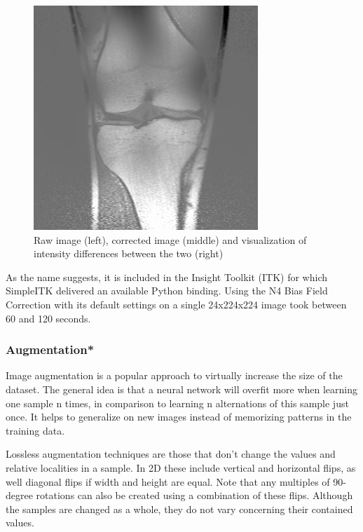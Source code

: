 \begin{figure}[H]
\endminipage\hfill
{}%
  \includegraphics[width=\linewidth]{imgs/diff2.jpg}
\endminipage
\caption{Raw image (left), corrected image (middle) and visualization of intensity differences between the two (right)}
\end{figure}

As the name suggests, it is included in the Insight Toolkit (ITK) for which SimpleITK delivered an available Python binding. Using the N4 Bias Field Correction with its default settings on a single 24x224x224 image took between 60 and 120 seconds.

\subsubsection{Augmentation*}

Image augmentation is a popular approach to virtually increase the size of the dataset. The general idea is that a neural network will overfit more when learning one sample n times, in comparison to learning n alternations of this sample just once. It helps to generalize on new images instead of memorizing patterns in the training data.

Lossless augmentation techniques are those that don't change the values and relative localities in a sample. In 2D these include vertical and horizontal flips, as well diagonal flips if width and height are equal. Note that any multiples of 90-degree rotations can also be created using a combination of these flips. Although the samples are changed as a whole, they do not vary concerning their contained values. 

